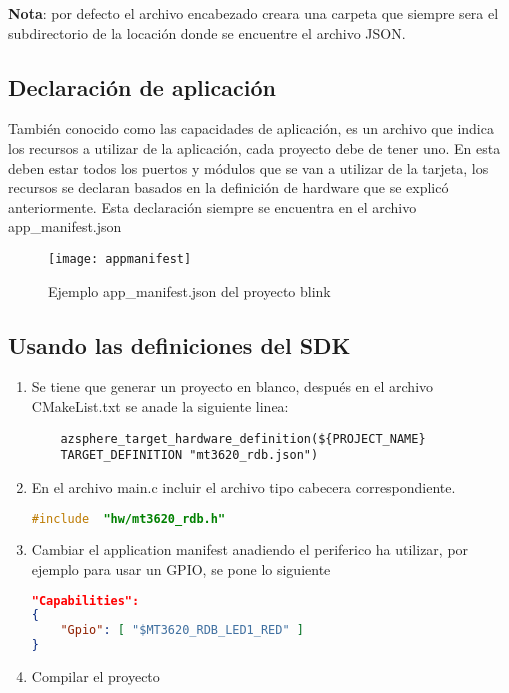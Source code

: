 \textbf{Nota}: por defecto el archivo encabezado creara una carpeta que siempre sera el subdirectorio de la locación donde se encuentre el archivo JSON.
\subsection{Declaración de aplicación}
También conocido como las capacidades de aplicación, es un archivo que indica los recursos a utilizar de la aplicación, cada proyecto debe de tener uno. En esta deben estar todos los puertos y módulos que se van a utilizar de la tarjeta, los recursos se declaran basados en la definición de hardware que se explic\'{o} anteriormente. Esta declaración siempre se encuentra en el archivo app\_manifest.json
\begin{figure}[h]
	\centering
	\texttt{[image: appmanifest]}
	\caption{Ejemplo app\_manifest.json del proyecto blink}
\end{figure}
\subsection{Usando las definiciones del SDK}

\begin{enumerate}
	\item Se tiene que generar un proyecto en blanco, después en el archivo CMakeList.txt se anade la siguiente linea:
	\begin{verbatim}
	azsphere_target_hardware_definition(${PROJECT_NAME} 
	TARGET_DEFINITION "mt3620_rdb.json") 
	\end{verbatim}
	\item 
	En el archivo main.c incluir el archivo tipo cabecera correspondiente.
	\begin{lstlisting}[language = C, firstnumber=0]
#include  "hw/mt3620_rdb.h"
	\end{lstlisting}
	\item 
	Cambiar el application manifest anadiendo el periferico ha utilizar, por ejemplo para usar un GPIO, se pone lo siguiente
	\begin{lstlisting}[language = json, firstnumber=0]
"Capabilities": 
{  
	"Gpio": [ "$MT3620_RDB_LED1_RED" ] 
}
	\end{lstlisting}
	\item 
	Compilar el proyecto
\end{enumerate}

